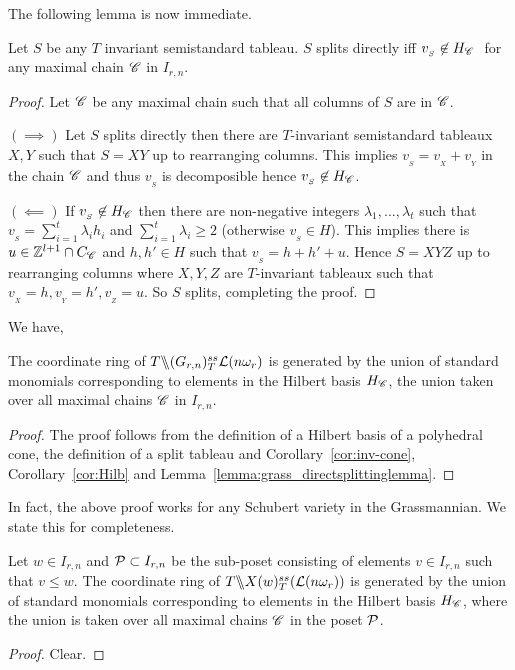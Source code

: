 The following lemma is now immediate.
\begin{lemma}
    \label{lemma:grass_directsplittinglemma}
    Let \(S\) be any \(T\) invariant semistandard tableau. \(S\) splits directly iff \(v_{_S} \not\in H_{\SC}\ \) for any maximal chain $\mathscr{C}$ in \(I_{r,n}\).
\end{lemma}
\begin{proof} 
    Let \(\mathscr{C}\) be any maximal chain such that all columns of \(S\) are in \(\mathscr{C}\).

    \((\implies)\)
    Let \(S\) splits directly then there are \(T\)-invariant semistandard tableaux \(X,Y\) such that 
    \(S = XY\) up to rearranging columns. 
    This implies \(v_{_S} = v_{_X} + v_{_Y}\) in the chain \(\mathscr{C}\) 
    and thus \(v_{_S}\) is decomposible hence \(v_{_S} \not\in H_{\mathscr{C}}\).

    \((\impliedby)\) If \(v_{_S} \not\in H_{\mathscr{C}}\) then there are non-negative integers 
    \(\lambda_1,...,\lambda_t\) such that \(v_{_S} = \sum_{i=1}^t \lambda_i h_i\) and \(\sum_{i=1}^t \lambda_i \ge 2\) (otherwise \(v_{_S} \in H\)). 
    This implies there is \(u\in \mathbb{Z}^{l+1}\cap C_{\mathscr{C}} \) and \(h,h' \in H\) 
    such that \(v_{_S} = h + h' + u\). Hence \(S = XYZ\) up to rearranging columns where \(X,Y,Z\) are \(T\)-invariant tableaux such that \(v_{_X}=h,v_{_Y}=h',v_{_Z}=u\).   So $S$ splits, completing the proof.
\end{proof}

We have,
\begin{theorem}
\label{thm:main}
    The coordinate ring of \(T \backslash\mkern-6mu\backslash (G_{{r},{n}})^{ss}_T{{\cal L}(n\omega_r)}\) is generated by the union of standard monomials corresponding to elements in the Hilbert basis $H_{\mathscr{C}}$, the union taken over all maximal chains $\mathscr{C}$ in \(I_{r,n}\).
\end{theorem}
\begin{proof}
The proof follows from the definition of a Hilbert basis of a polyhedral cone, the definition of a split tableau and Corollary~\ref{cor:inv-cone}, Corollary~\ref{cor:Hilb} and Lemma~\ref{lemma:grass_directsplittinglemma}.

\end{proof}

In fact, the above proof works for any Schubert variety in the Grassmannian. We state this for completeness.
\begin{corollary}
\label{cor:schub}
    Let \(w \in I_{r,n}\) and \({\cal P}\subset I_{r,n}\) be the sub-poset consisting of elements $v \in I_{r,n}$ such that $v \leq w$. The coordinate ring of \(T \backslash\mkern-6mu\backslash X(w)^{ss}_T({\cal L}(n\omega_r))\) is generated by the union of standard monomials corresponding to elements in the Hilbert basis $H_{\mathscr{C}}$, where the union is taken over all maximal chains $\mathscr{C}$ in the poset \({\cal P}\).
\end{corollary}
\begin{proof}
 Clear.
\end{proof}

